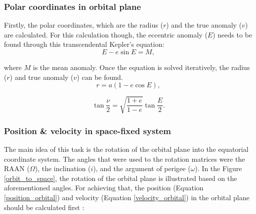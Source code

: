 \bigskip
\subsubsection{Polar coordinates in orbital plane}
\bigskip

Firstly, the polar coordinates, which are the radius ($r$) and the true anomaly ($v$) are calculated. For this calculation though, the eccentric anomaly ($E$) needs to be found through this transcendental Kepler's equation:
\begin{equation}
E - e \sin{E} = M,
\end{equation}

where $M$ is the mean anomaly. Once the equation is solved iteratively, the radius ($r$) and true anomaly ($v$) can be found.
\begin{equation}
r = a(1 - e \cos{E}),
\end{equation}

\begin{equation}
\tan{\frac{\nu}{2}} = \sqrt{\frac{1 + e}{1 - e}} \tan{\frac{E}{2}}.
\end{equation}


\bigskip
\subsubsection{Position \& velocity in space-fixed system}
\bigskip

The main idea of this task is the rotation of the orbital plane into the equatorial coordinate system. The angles that were used to the rotation matrices were the RAAN ($\Omega$), the inclination ($i$), and the argument of perigee ($\omega$). In the Figure \ref{orbit_to_space}, the rotation of the orbital plane is illustrated based on the aforementioned angles. For achieving that, the position (Equation \ref{position_orbital}) and velocity (Equation \ref{velocity_orbital}) in the orbital plane should be calculated first \cite{Montenbruck}:

